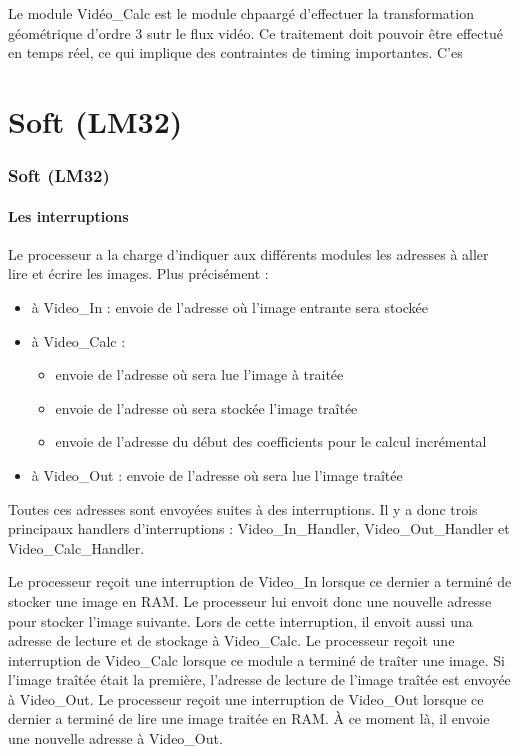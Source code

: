 {{}   	
    	Le module Vidéo\_Calc est le module chpaargé d'effectuer la transformation géométrique d'ordre 3 sutr le flux vidéo. Ce traitement doit pouvoir être effectué en temps réel, ce qui implique des contraintes de timing importantes. C'es

{}










    \part{Soft (LM32)} 

    \section*{Soft (LM32)}


		\subsection*{Les interruptions}
{Le processeur a la charge d'indiquer aux différents modules les adresses à aller lire et écrire les images. Plus précisément :

\begin{itemize}
	\item à Video\_In : envoie de l'adresse où l'image entrante sera stockée
	\item à Video\_Calc : \begin{itemize}
								\item envoie de l'adresse où sera lue l'image à traitée
								\item envoie de l'adresse où sera stockée l'image traîtée
								\item envoie de l'adresse du début des coefficients pour le calcul incrémental
							\end{itemize}
	\item à Video\_Out : envoie de l'adresse où sera lue l'image traîtée
\end{itemize}

Toutes ces adresses sont envoyées suites à des interruptions.
Il y a donc trois principaux handlers d'interruptions : Video\_In\_Handler, Video\_Out\_Handler et Video\_Calc\_Handler.

Le processeur reçoit une interruption de Video\_In lorsque ce dernier a terminé de stocker une image en RAM. Le processeur lui envoit donc une nouvelle adresse pour stocker l'image suivante. Lors de cette interruption, il envoit aussi una adresse de lecture et de stockage à Video\_Calc.
Le processeur reçoit une interruption de Video\_Calc lorsque ce module a terminé de traîter une image. Si l'image traîtée était la première, l'adresse de lecture de l'image traîtée est envoyée à Video\_Out.
Le processeur reçoit une interruption de Video\_Out lorsque ce dernier a terminé de lire une image traitée en RAM. À ce moment là, il envoie une nouvelle adresse à Video\_Out.

}}
